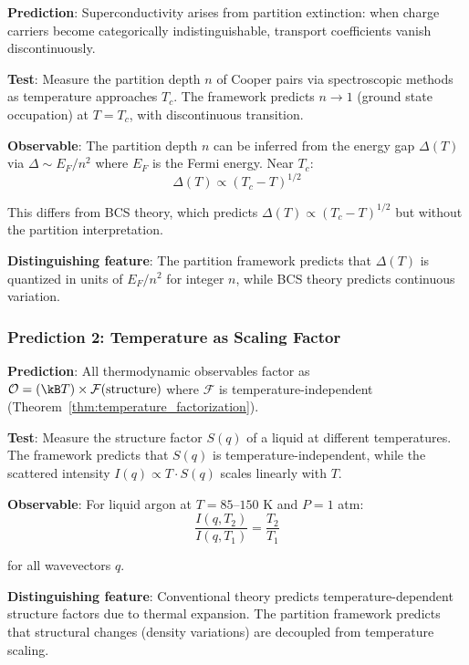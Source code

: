 \textbf{Prediction}: Superconductivity arises from partition extinction: when charge carriers become categorically indistinguishable, transport coefficients vanish discontinuously.

\textbf{Test}: Measure the partition depth $n$ of Cooper pairs via spectroscopic methods as temperature approaches $T_c$. The framework predicts $n \to 1$ (ground state occupation) at $T = T_c$, with discontinuous transition.

\textbf{Observable}: The partition depth $n$ can be inferred from the energy gap $\Delta(T)$ via $\Delta \sim E_F/n^2$ where $E_F$ is the Fermi energy. Near $T_c$:
\begin{equation}
\Delta(T) \propto (T_c - T)^{1/2}
\end{equation}

This differs from BCS theory, which predicts $\Delta(T) \propto (T_c - T)^{1/2}$ but without the partition interpretation.

\textbf{Distinguishing feature}: The partition framework predicts that $\Delta(T)$ is quantized in units of $E_F/n^2$ for integer $n$, while BCS theory predicts continuous variation.

\subsubsection{Prediction 2: Temperature as Scaling Factor}

\textbf{Prediction}: All thermodynamic observables factor as $\mathcal{O} = (\kB T) \times \mathcal{F}(\text{structure})$ where $\mathcal{F}$ is temperature-independent (Theorem~\ref{thm:temperature_factorization}).

\textbf{Test}: Measure the structure factor $S(q)$ of a liquid at different temperatures. The framework predicts that $S(q)$ is temperature-independent, while the scattered intensity $I(q) \propto T \cdot S(q)$ scales linearly with $T$.

\textbf{Observable}: For liquid argon at $T = 85$–$150$ K and $P = 1$ atm:
\begin{equation}
\frac{I(q, T_2)}{I(q, T_1)} = \frac{T_2}{T_1}
\end{equation}

for all wavevectors $q$.

\textbf{Distinguishing feature}: Conventional theory predicts temperature-dependent structure factors due to thermal expansion. The partition framework predicts that structural changes (density variations) are decoupled from temperature scaling.


